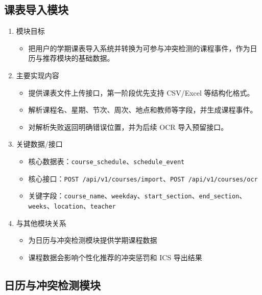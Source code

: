 \documentclass[UTF8,a4paper,12pt,fontset=none]{ctexrep}
\providecommand{\tightlist}{}
\begin{document}
\subsection{课表导入模块}\label{ux8bfeux8868ux5bfcux5165ux6a21ux5757}

\begin{enumerate}
\def\labelenumi{\arabic{enumi}.}
\item
  模块目标

  \begin{itemize}
  \tightlist
  \item
    把用户的学期课表导入系统并转换为可参与冲突检测的课程事件，作为日历与推荐模块的基础数据。
  \end{itemize}
\item
  主要实现内容

  \begin{itemize}
  \tightlist
  \item
    提供课表文件上传接口，第一阶段优先支持 CSV/Excel 等结构化格式。
  \item
    解析课程名、星期、节次、周次、地点和教师等字段，并生成课程事件。
  \item
    对解析失败返回明确错误位置，并为后续 OCR 导入预留接口。
  \end{itemize}
\item
  关键数据/接口

  \begin{itemize}
  \tightlist
  \item
    核心数据表：\texttt{course\_schedule}、\texttt{schedule\_event}
  \item
    核心接口：\texttt{POST\ /api/v1/courses/import}、\texttt{POST\ /api/v1/courses/ocr}
  \item
    关键字段：\texttt{course\_name}、\texttt{weekday}、\texttt{start\_section}、\texttt{end\_section}、\texttt{weeks}、\texttt{location}、\texttt{teacher}
  \end{itemize}
\item
  与其他模块关系

  \begin{itemize}
  \tightlist
  \item
    为日历与冲突检测模块提供学期课程数据
  \item
    课程数据会影响个性化推荐的冲突惩罚和 ICS 导出结果
  \end{itemize}
\end{enumerate}

\subsection{日历与冲突检测模块}\label{ux65e5ux5386ux4e0eux51b2ux7a81ux68c0ux6d4bux6a21ux5757}
\end{document}
